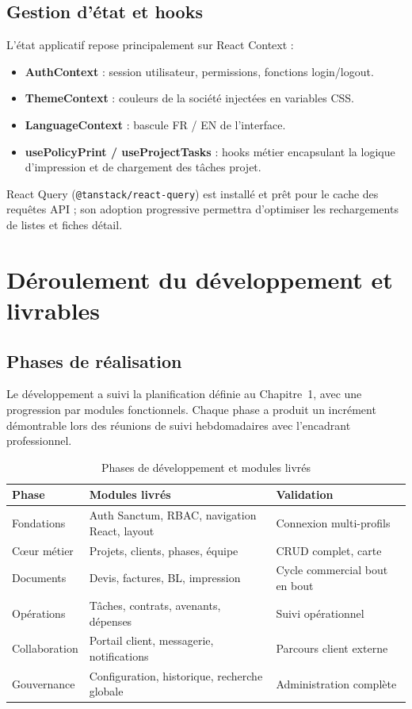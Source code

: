 \subsection{Gestion d'état et hooks}

L'état applicatif repose principalement sur React Context :

\begin{itemize}
  \item \textbf{AuthContext} : session utilisateur, permissions, fonctions login/logout.
  \item \textbf{ThemeContext} : couleurs de la société injectées en variables CSS.
  \item \textbf{LanguageContext} : bascule FR / EN de l'interface.
  \item \textbf{usePolicyPrint / useProjectTasks} : hooks métier encapsulant la
  logique d'impression et de chargement des tâches projet.
\end{itemize}

React Query (\texttt{@tanstack/react-query}) est installé et prêt pour le cache
des requêtes API ; son adoption progressive permettra d'optimiser les rechargements
de listes et fiches détail.

\section{Déroulement du développement et livrables}

\subsection{Phases de réalisation}

Le développement a suivi la planification définie au Chapitre~1, avec une
progression par modules fonctionnels. Chaque phase a produit un incrément
démontrable lors des réunions de suivi hebdomadaires avec l'encadrant professionnel.

\begin{table}[H]
\caption{Phases de développement et modules livrés}
\label{tab:livrables}
\centering
\small
\begin{tabular}{|l|p{5.5cm}|p{5.5cm}|}
\hline
\textbf{Phase} & \textbf{Modules livrés} & \textbf{Validation} \\
\hline
Fondations & Auth Sanctum, RBAC, navigation React, layout & Connexion multi-profils \\
\hline
Cœur métier & Projets, clients, phases, équipe & CRUD complet, carte \\
\hline
Documents & Devis, factures, BL, impression & Cycle commercial bout en bout \\
\hline
Opérations & Tâches, contrats, avenants, dépenses & Suivi opérationnel \\
\hline
Collaboration & Portail client, messagerie, notifications & Parcours client externe \\
\hline
Gouvernance & Configuration, historique, recherche globale & Administration complète \\
\hline
\end{tabular}
\end{table}

